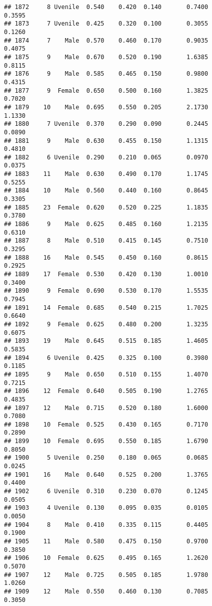 \documentclass[
]{article}
\begin{document}
\begin{verbatim}
## 1872     8 Uvenile  0.540    0.420  0.140       0.7400         0.3595
## 1873     7 Uvenile  0.425    0.320  0.100       0.3055         0.1260
## 1874     7    Male  0.570    0.460  0.170       0.9035         0.4075
## 1875     9    Male  0.670    0.520  0.190       1.6385         0.8115
## 1876     9    Male  0.585    0.465  0.150       0.9800         0.4315
## 1877     9  Female  0.650    0.500  0.160       1.3825         0.7020
## 1879    10    Male  0.695    0.550  0.205       2.1730         1.1330
## 1880     7 Uvenile  0.370    0.290  0.090       0.2445         0.0890
## 1881     9    Male  0.630    0.455  0.150       1.1315         0.4810
## 1882     6 Uvenile  0.290    0.210  0.065       0.0970         0.0375
## 1883    11    Male  0.630    0.490  0.170       1.1745         0.5255
## 1884    10    Male  0.560    0.440  0.160       0.8645         0.3305
## 1885    23  Female  0.620    0.520  0.225       1.1835         0.3780
## 1886     9    Male  0.625    0.485  0.160       1.2135         0.6310
## 1887     8    Male  0.510    0.415  0.145       0.7510         0.3295
## 1888    16    Male  0.545    0.450  0.160       0.8615         0.2925
## 1889    17  Female  0.530    0.420  0.130       1.0010         0.3400
## 1890     9  Female  0.690    0.530  0.170       1.5535         0.7945
## 1891    14  Female  0.685    0.540  0.215       1.7025         0.6640
## 1892     9  Female  0.625    0.480  0.200       1.3235         0.6075
## 1893    19    Male  0.645    0.515  0.185       1.4605         0.5835
## 1894     6 Uvenile  0.425    0.325  0.100       0.3980         0.1185
## 1895     9    Male  0.650    0.510  0.155       1.4070         0.7215
## 1896    12  Female  0.640    0.505  0.190       1.2765         0.4835
## 1897    12    Male  0.715    0.520  0.180       1.6000         0.7080
## 1898    10  Female  0.525    0.430  0.165       0.7170         0.2890
## 1899    10  Female  0.695    0.550  0.185       1.6790         0.8050
## 1900     5 Uvenile  0.250    0.180  0.065       0.0685         0.0245
## 1901    16    Male  0.640    0.525  0.200       1.3765         0.4400
## 1902     6 Uvenile  0.310    0.230  0.070       0.1245         0.0505
## 1903     4 Uvenile  0.130    0.095  0.035       0.0105         0.0050
## 1904     8    Male  0.410    0.335  0.115       0.4405         0.1900
## 1905    11    Male  0.580    0.475  0.150       0.9700         0.3850
## 1906    10  Female  0.625    0.495  0.165       1.2620         0.5070
## 1907    12    Male  0.725    0.505  0.185       1.9780         1.0260
## 1909    12    Male  0.550    0.460  0.130       0.7085         0.3050

\end{verbatim}
\end{document}
